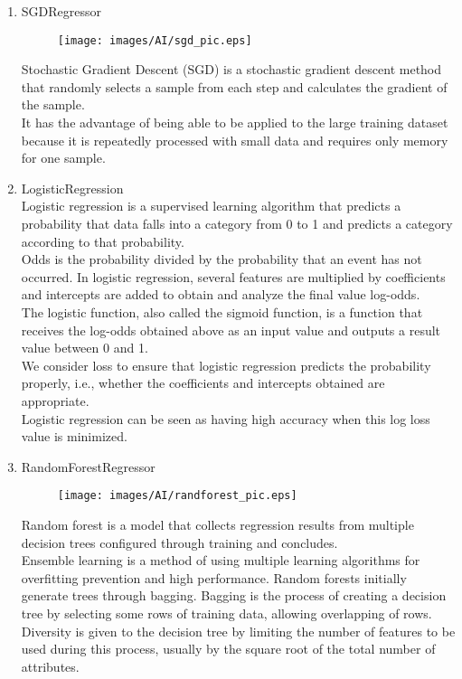 \documentclass[11pt, conference]{IEEEtran}
\begin{document}
\begin{enumerate}[label=\arabic*]
\begin{enumerate}[label=\alph*]
\begin{enumerate}
            \item SGDRegressor\\
            \begin{figure}[H]
                \centering
                \texttt{[image: images/AI/sgd\_pic.eps]}
            \end{figure}
             Stochastic Gradient Descent (SGD) is a stochastic gradient descent method that randomly selects a sample from each step and calculates the gradient of the sample.\\
             It has the advantage of being able to be applied to the large training dataset because it is repeatedly processed with small data and requires only memory for one sample.
            \item LogisticRegression\\
            Logistic regression is a supervised learning algorithm that predicts a probability that data falls into a category from 0 to 1 and predicts a category according to that probability. \\
            Odds is the probability divided by the probability that an event has not occurred. In logistic regression, several features are multiplied by coefficients and intercepts are added to obtain and analyze the final value log-odds.\\
            The logistic function, also called the sigmoid function, is a function that receives the log-odds obtained above as an input value and outputs a result value between 0 and 1. \\
            We consider loss to ensure that logistic regression predicts the probability properly, i.e., whether the coefficients and intercepts obtained are appropriate. \\
            Logistic regression can be seen as having high accuracy when this log loss value is minimized.
            \item RandomForestRegressor\\
            \begin{figure}[H]
                \texttt{[image: images/AI/randforest\_pic.eps]}
            \end{figure}
            Random forest is a model that collects regression results from multiple decision trees configured through training and concludes.\\
            Ensemble learning is a method of using multiple learning algorithms for overfitting prevention and high performance. Random forests initially generate trees through bagging. Bagging is the process of creating a decision tree by selecting some rows of training data, allowing overlapping of rows. Diversity is given to the decision tree by limiting the number of features to be used during this process, usually by the square root of the total number of attributes.

\end{enumerate}
\end{enumerate}
\end{enumerate}
\end{document}
